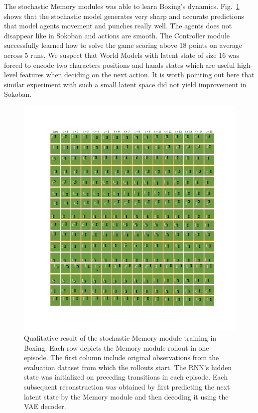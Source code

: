 The stochastic Memory modules was able to learn Boxing’s dynamics. Fig.~\ref{Fig.WM_Boxing_memory} shows that the stochastic model generates very sharp and accurate predictions that model agents movement and punches really well. The agents does not disappear like in Sokoban and actions are smooth.
The Controller module successfully learned how to solve the game scoring above 18 points on average across 5 runs. We suspect that World Models with latent state of size 16 was forced to encode two characters positions and hands states which are useful high-level features when deciding on the next action. It is worth pointing out here that similar experiment with such a small latent space did not yield improvement in Sokoban.

\begin{figure}[H]
\includegraphics[width=1\textwidth,keepaspectratio]{figures/Boxing_memory.png}
\caption[Qualitative result of the World Models' stochastic Memory module training in Boxing]{Qualitative result of the stochastic Memory module training in Boxing. Each row depicts the Memory module rollout in one episode. The first column include original observations from the evaluation dataset from which the rollouts start. The RNN's hidden state was initialized on preceding transitions in each episode. Each subsequent reconstruction was obtained by first predicting the next latent state by the Memory module and then decoding it using the VAE decoder.}
\label{Fig.WM_Boxing_memory}
\end{figure}


